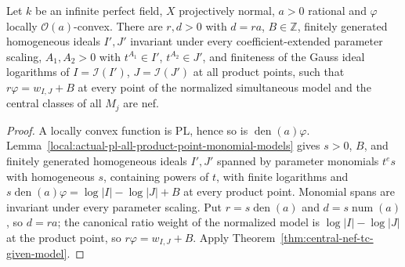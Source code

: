 \begin{theorem}
\label{thm:central-nef-tc-native-product-ideal}
\leanok
{}
Let $k$ be an infinite perfect field, $X$ projectively normal, $a>0$ rational
and $\varphi$ locally $\mathcal O(a)$-convex.  There are $r,d>0$ with $d=ra$,
$B\in\mathbb Z$, finitely generated homogeneous ideals $I',J'$ invariant under
every coefficient-extended parameter scaling, $A_1,A_2>0$ with
$t^{A_1}\in I'$, $t^{A_2}\in J'$, and finiteness of the Gauss ideal logarithms
of $I=\mathcal I(I')$, $J=\mathcal I(J')$ at all product points, such that
$r\varphi=w_{I,J}+B$ at every point of the normalized simultaneous model and
the central classes of all $M_j$ are nef.
\end{theorem}
\begin{proof}
A locally convex function is PL, hence so is $\operatorname{den}(a)\varphi$.
Lemma~\ref{local:actual-pl-all-product-point-monomial-models} gives
$s>0$, $B$, and finitely generated homogeneous ideals $I',J'$ spanned by
parameter monomials $t^e s$ with homogeneous $s$, containing powers of $t$,
with finite logarithms and $s\operatorname{den}(a)\varphi =
\log|I|-\log|J|+B$ at every product point.  Monomial spans are invariant
under every parameter scaling.  Put $r=s\operatorname{den}(a)$ and
$d=s\operatorname{num}(a)$, so $d=ra$; the canonical ratio weight of the
normalized model is $\log|I|-\log|J|$ at the product point, so
$r\varphi=w_{I,J}+B$.  Apply Theorem~\ref{thm:central-nef-tc-given-model}.
\end{proof}

